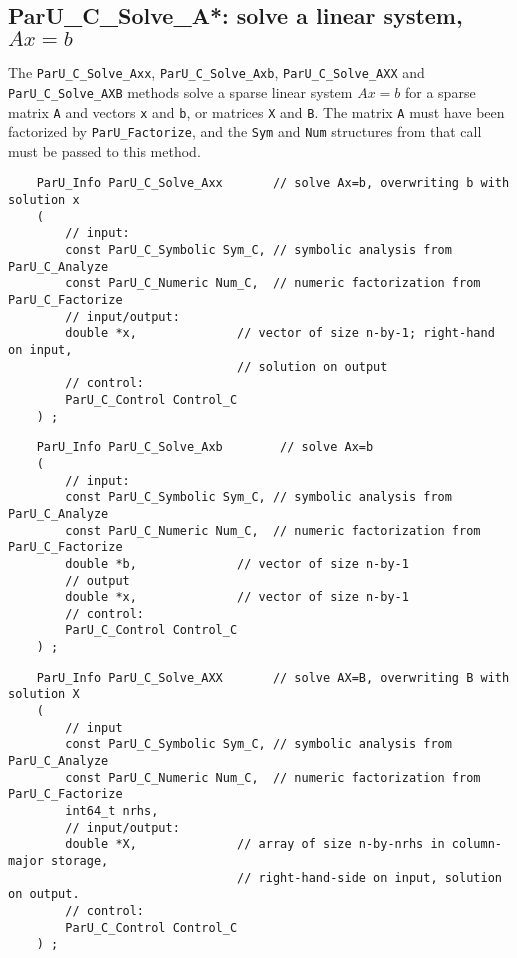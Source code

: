 \documentclass[12pt]{article}
\begin{document}
\subsection{{\sf ParU\_C\_Solve\_A*}: solve a linear system, $Ax=b$}

    The \verb'ParU_C_Solve_Axx',  \verb'ParU_C_Solve_Axb',
    \verb'ParU_C_Solve_AXX' and \verb'ParU_C_Solve_AXB' methods solve a sparse
    linear system $Ax=b$ for a sparse matrix \verb'A' and vectors \verb'x' and
    \verb'b', or matrices \verb'X' and \verb'B'.  The matrix \verb'A' must have
    been factorized by \verb'ParU_Factorize', and the \verb'Sym' and \verb'Num'
    structures from that call must be passed to this method.

    {\footnotesize
    \begin{verbatim}
    ParU_Info ParU_C_Solve_Axx       // solve Ax=b, overwriting b with solution x
    (
        // input:
        const ParU_C_Symbolic Sym_C, // symbolic analysis from ParU_C_Analyze
        const ParU_C_Numeric Num_C,  // numeric factorization from ParU_C_Factorize
        // input/output:
        double *x,              // vector of size n-by-1; right-hand on input,
                                // solution on output
        // control:
        ParU_C_Control Control_C
    ) ; \end{verbatim} }

    {\footnotesize
    \begin{verbatim}
    ParU_Info ParU_C_Solve_Axb        // solve Ax=b
    (
        // input:
        const ParU_C_Symbolic Sym_C, // symbolic analysis from ParU_C_Analyze
        const ParU_C_Numeric Num_C,  // numeric factorization from ParU_C_Factorize
        double *b,              // vector of size n-by-1
        // output
        double *x,              // vector of size n-by-1
        // control:
        ParU_C_Control Control_C
    ) ; \end{verbatim} }

    {\footnotesize
    \begin{verbatim}
    ParU_Info ParU_C_Solve_AXX       // solve AX=B, overwriting B with solution X
    (
        // input
        const ParU_C_Symbolic Sym_C, // symbolic analysis from ParU_C_Analyze
        const ParU_C_Numeric Num_C,  // numeric factorization from ParU_C_Factorize
        int64_t nrhs,
        // input/output:
        double *X,              // array of size n-by-nrhs in column-major storage,
                                // right-hand-side on input, solution on output.
        // control:
        ParU_C_Control Control_C
    ) ; \end{verbatim} }
\end{document}
